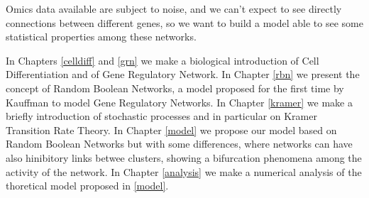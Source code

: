 Omics data available are subject to noise, and we can’t expect to see directly connections between different genes, so we want to build a model able to see some statistical properties among these networks.

In Chapters \ref{celldiff} and \ref{grn} we make a biological introduction of Cell Differentiation and of Gene Regulatory Network.
In Chapter \ref{rbn} we present the concept of Random Boolean Networks, a model proposed for the first time by Kauffman to model Gene Regulatory Networks.
In Chapter \ref{kramer} we make a briefly introduction of stochastic processes and in particular on Kramer Transition Rate Theory.
In Chapter \ref{model} we propose our model based on Random Boolean Networks but with some differences, where networks can have also hinibitory links betwee clusters, showing a bifurcation phenomena among the activity of the network.
In Chapter \ref{analysis} we make a numerical analysis of the thoretical model proposed in \ref{model}.

